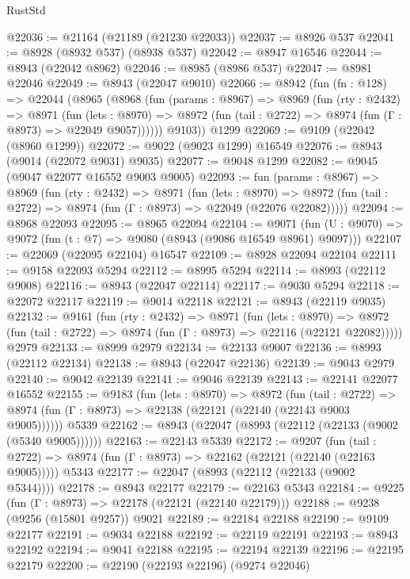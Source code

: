 \begin{lexlean}{RustStd}
\begin{coremodule}
{\begin{coremodule}
{{{{{{{{{{{{{{{{{{{{{{{{{{{{{{{{{{{{{{{@22036 := @21164 (@21189 (@21230 @22033))
@22037 := @8926 @537
@22041 := @8928 (@8932 @537) (@8938 @537)
@22042 := @8947 @16546
@22044 := @8943 (@22042 @8962)
@22046 := @8985 (@8986 @537)
@22047 := @8981 @22046
@22049 := @8943 (@22047 @9010)
@22066 := @8942
    (fun (fn : @128) =>
    @22044
      (@8965
        (@8968
          (fun (params : @8967) =>
          @8969
            (fun (rty : @2432) =>
            @8971
              (fun (lets : @8970) =>
              @8972 (fun (tail : @2722) => @8974 (fun (Γ : @8973) => @22049 @9057))))))
        @9103))
    @1299
@22069 := @9109 (@22042 (@8960 @1299))
@22072 := @9022 (@9023 @1299) @16549
@22076 := @8943 (@9014 (@22072 @9031) @9035)
@22077 := @9048 @1299
@22082 := @9045 (@9047 @22077 @16552 @9003 @9005)
@22093 := fun (params : @8967) =>
  @8969
    (fun (rty : @2432) =>
    @8971
      (fun (lets : @8970) =>
      @8972 (fun (tail : @2722) => @8974 (fun (Γ : @8973) => @22049 (@22076 @22082)))))
@22094 := @8968 @22093
@22095 := @8965 @22094
@22104 := @9071
    (fun (U : @9070) => @9072 (fun (t : @7) => @9080 (@8943 (@9086 @16549 @8961) @9097)))
@22107 := @22069 (@22095 @22104) @16547
@22109 := @8928 @22094 @22104
@22111 := @9158 @22093 @5294
@22112 := @8995 @5294
@22114 := @8993 (@22112 @9008)
@22116 := @8943 (@22047 @22114)
@22117 := @9030 @5294
@22118 := @22072 @22117
@22119 := @9014 @22118
@22121 := @8943 (@22119 @9035)
@22132 := @9161
    (fun (rty : @2432) =>
    @8971
      (fun (lets : @8970) =>
      @8972 (fun (tail : @2722) => @8974 (fun (Γ : @8973) => @22116 (@22121 @22082)))))
    @2979
@22133 := @8999 @2979
@22134 := @22133 @9007
@22136 := @8993 (@22112 @22134)
@22138 := @8943 (@22047 @22136)
@22139 := @9043 @2979
@22140 := @9042 @22139
@22141 := @9046 @22139
@22143 := @22141 @22077 @16552
@22155 := @9183
    (fun (lets : @8970) =>
    @8972
      (fun (tail : @2722) =>
      @8974 (fun (Γ : @8973) => @22138 (@22121 (@22140 (@22143 @9003 @9005))))))
    @5339
@22162 := @8943 (@22047 (@8993 (@22112 (@22133 (@9002 (@5340 @9005))))))
@22163 := @22143 @5339
@22172 := @9207
    (fun (tail : @2722) => @8974 (fun (Γ : @8973) => @22162 (@22121 (@22140 (@22163 @9005)))))
    @5343
@22177 := @22047 (@8993 (@22112 (@22133 (@9002 @5344))))
@22178 := @8943 @22177
@22179 := @22163 @5343
@22184 := @9225 (fun (Γ : @8973) => @22178 (@22121 (@22140 @22179)))
@22188 := @9238 (@9256 (@15801 @9257)) @9021
@22189 := @22184 @22188
@22190 := @9109 @22177
@22191 := @9034 @22188
@22192 := @22119 @22191
@22193 := @8943 @22192
@22194 := @9041 @22188
@22195 := @22194 @22139
@22196 := @22195 @22179
@22200 := @22190 (@22193 @22196) (@9274 @22046)
}}}}}}}}}}}}}}}}}}}}}}}}}}}}}}}}}}}}}}}
\end{coremodule}}
\end{coremodule}
\end{lexlean}
